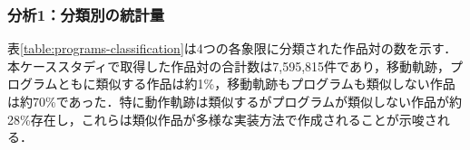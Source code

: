 \documentclass[T,J]{fose} %
\newcommand{\todo}[1]{\colorbox{yellow}{{\bf TODO}:}{\color{red} {\textbf{[#1]}}}}
\begin{document}
\subsubsection{分析1：分類別の統計量}

表\ref{table:programs-classification}は4つの各象限に分類された作品対の数を示す．本ケーススタディで取得した作品対の合計数は7,595,815件であり，移動軌跡，プログラムともに類似する作品は約1\%，移動軌跡もプログラムも類似しない作品は約70\%であった．特に動作軌跡は類似するがプログラムが類似しない作品が約28\%存在し，これらは類似作品が多様な実装方法で作成されることが示唆される．


\end{document}
